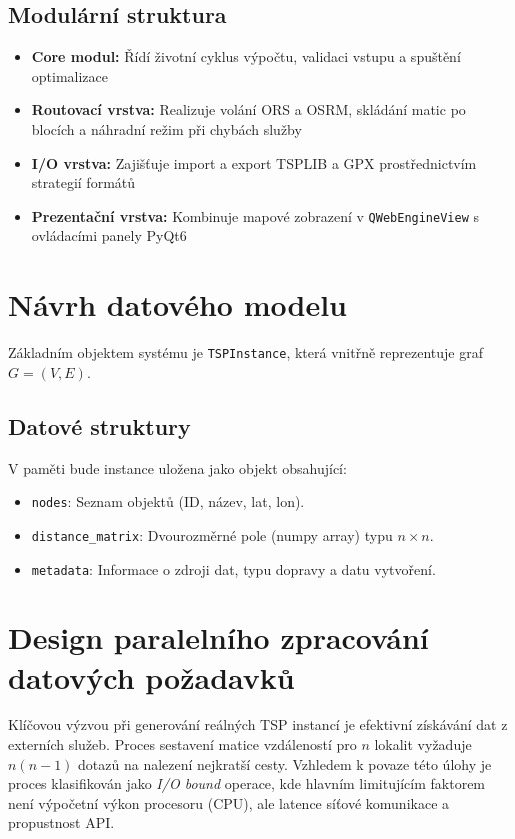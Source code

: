\subsection{Modulární struktura}
\begin{itemize}
    \item \textbf{Core modul:} Řídí životní cyklus výpočtu, validaci vstupu a spuštění optimalizace
    \item \textbf{Routovací vrstva:} Realizuje volání ORS a OSRM, skládání matic po blocích a náhradní režim při chybách služby
    \item \textbf{I/O vrstva:} Zajišťuje import a export TSPLIB a GPX prostřednictvím strategií formátů
    \item \textbf{Prezentační vrstva:} Kombinuje mapové zobrazení v \texttt{QWebEngineView} s ovládacími panely PyQt6
\end{itemize}

\section{Návrh datového modelu}
Základním objektem systému je \texttt{TSPInstance}, která vnitřně reprezentuje graf $G=(V, E)$.

\subsection{Datové struktury}
V paměti bude instance uložena jako objekt obsahující:
\begin{itemize}
    \item \texttt{nodes}: Seznam objektů (ID, název, lat, lon).
    \item \texttt{distance\_matrix}: Dvourozměrné pole (numpy array) typu $n \times n$.
    \item \texttt{metadata}: Informace o zdroji dat, typu dopravy a datu vytvoření.
\end{itemize}

\section{Design paralelního zpracování datových požadavků}
\label{sec:design_paralelizace}

Klíčovou výzvou při generování reálných TSP instancí je efektivní získávání dat z externích služeb. Proces sestavení matice vzdáleností pro $n$ lokalit vyžaduje $n(n-1)$ dotazů na nalezení nejkratší cesty. Vzhledem k povaze této úlohy je proces klasifikován jako \textit{I/O bound} operace, kde hlavním limitujícím faktorem není výpočetní výkon procesoru (CPU), ale latence síťové komunikace a propustnost API.

